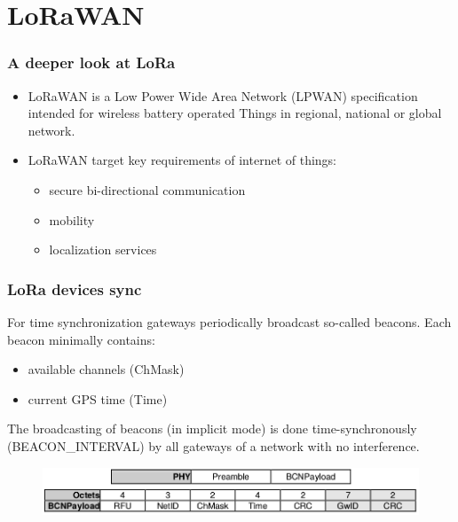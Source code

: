\section{LoRaWAN}
  
\begin{frame}[fragile]
  \frametitle{A deeper look at LoRa}
  \begin{itemize}
      \item LoRaWAN is a Low Power Wide Area Network (LPWAN) specification intended for wireless battery operated Things in regional, national or global network. 
      \item LoRaWAN target key requirements of internet of things:
      \begin{itemize}
      	\item secure bi-directional communication
      	\item mobility
      	\item localization services 
      \end{itemize}
  \end{itemize}
\end{frame}

\begin{frame}[fragile]
  \frametitle{LoRa devices sync}
  For time synchronization gateways periodically broadcast so-called beacons. Each beacon
  minimally contains:
  \begin{itemize}
      \item available channels (ChMask)
      \item current GPS time (Time)
      \end{itemize}
      The broadcasting of beacons (in implicit mode) is done time-synchronously (BEACON\_INTERVAL) by all gateways of a network with no interference.
      \begin{figure}
  \centering
  \includegraphics[width=\textwidth]{img/lora_beaconing.png}
  \end{figure}
\end{frame}

